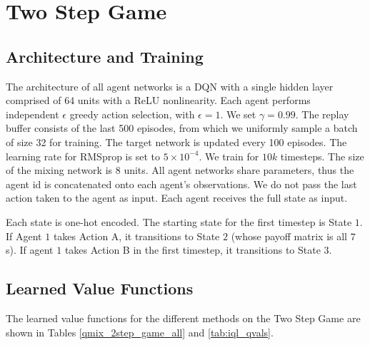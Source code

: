 \documentclass[twoside,11pt]{article}
\begin{document}
 \section{Two Step Game}
\label{sec:2step_arch}

\subsection{Architecture and Training}

The architecture of all agent networks is a DQN with a single hidden layer comprised of $64$ units with a ReLU nonlinearity. Each agent performs independent $\epsilon$ greedy action selection, with $\epsilon=1$. We set $\gamma=0.99$. The replay buffer consists of the last 500 episodes, from which we uniformly sample a batch of size 32 for training. The target network is updated every 100 episodes. The learning rate for RMSprop is set to $5 \times 10^{-4}$. We train for $10k$ timesteps. The size of the mixing network is $8$ units. All agent networks share parameters, thus the agent id is concatenated onto each agent's observations. We do not pass the last action taken to the agent as input. Each agent receives the full state as input.

Each state is one-hot encoded. The starting state for the first timestep is State $1$. If Agent $1$ takes Action A, it transitions to State $2$ (whose payoff matrix is all $7$s). If agent $1$ takes Action B in the first timestep, it transitions to State $3$. 

\subsection{Learned Value Functions}

The learned value functions for the different methods on the Two Step Game are shown in Tables \ref{qmix_2step_game_all} and \ref{tab:iql_qvals}. 
\end{document}
